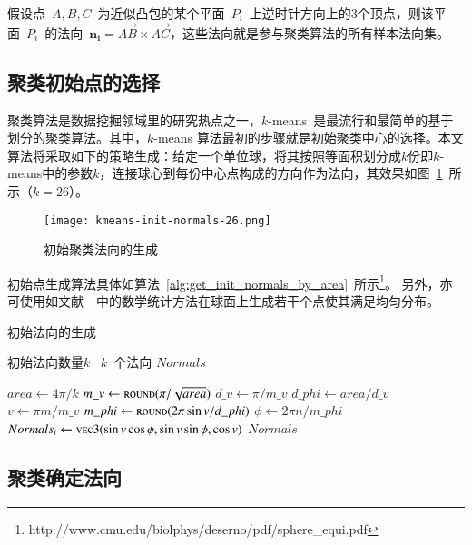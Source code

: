 假设点~$A,B,C$~为近似凸包的某个平面~$P_i$~上逆时针方向上的3个顶点，则该平面~$P_i$~的法向~$\bm{n_i}
= \overrightarrow{AB} \times
\overrightarrow{AC}$，这些法向就是参与聚类算法的所有样本法向集。

\subsection{聚类初始点的选择}
\label{subsec:initial-normals}

聚类算法是数据挖掘领域里的研究热点之一，$k$-means~是最流行和最简单的基于划分的聚类算法\cite{Jain2010}。其中，$k$-means
算法最初的步骤就是初始聚类中心的选择。本文算法将采取如下的策略生成：给定一个单位球，将其按照等面积划分成$k$份即$k$-means中的参数$k$，连接球心到每份中心点构成的方向作为法向，其效果如图~\ref{lbl:kmeans-init-normals-26}~所示（$k=26$）。

\begin{figure}[htbp]
    \centering
    \texttt{[image: kmeans-init-normals-26.png]}
    \caption{初始聚类法向的生成}
    \label{lbl:kmeans-init-normals-26}
\end{figure}

初始点生成算法具体如算法~\ref{alg:get_init_normals_by_area}~所示\footnote{http://www.cmu.edu/biolphys/deserno/pdf/sphere\_equi.pdf}。
另外，亦可使用如文献~~中的数学统计方法在球面上生成若干个点使其满足均匀分布。

\begin{algorithm}[htbp]
\small
\caption{初始法向的生成}
\label{alg:get_init_normals_by_area}
\begin{algorithmic}[1]
\Require
初始法向数量$k$
\Ensure
~$k$~个法向 $Normals$

  \State $area \leftarrow 4\pi / k$
  \State $m\_v \gets \Call{round}{\pi/\sqrt{area}}$
  \State $d\_v \gets \pi/m\_v$
  \State $d\_phi \gets area/d\_v$
      \State $v \gets \pi m/m\_v$
      \State $m\_phi \gets \Call{round}{2\pi\sin{v}/d\_phi}$
          \State $\phi \gets 2\pi n/m\_phi$
          \State $Normals_i \gets \Call{vec3}{\sin{v}\cos{\phi},\sin{v}\sin{\phi},\cos{v}}$
      \EndFor
  \EndFor
  \State \Return $Normals$
  \EndFunction
\end{algorithmic}
\end{algorithm}
 
\subsection{聚类确定法向}
\label{subsec:determ-normals}

